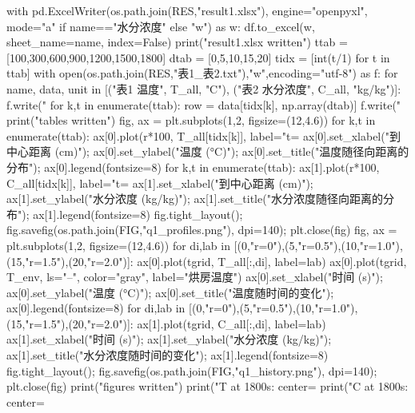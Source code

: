 \begin{codelisting}
    with pd.ExcelWriter(os.path.join(RES,"result1.xlsx"), engine="openpyxl", mode="a" if name=="水分浓度" else "w") as w:
        df.to_excel(w, sheet_name=name, index=False)
print("result1.xlsx written")
ttab = [100,300,600,900,1200,1500,1800]
dtab = [0,5,10,15,20]
tidx = [int(t/1) for t in ttab]
with open(os.path.join(RES,"表1_表2.txt"),"w",encoding="utf-8") as f:
    for name, data, unit in [("表1 温度", T_all, "C"), ("表2 水分浓度", C_all, "kg/kg")]:
        f.write("\n%
        for k,t in enumerate(ttab):
            row = data[tidx[k], np.array(dtab)]
            f.write("%
print("tables written")
fig, ax = plt.subplots(1,2, figsize=(12,4.6))
for k,t in enumerate(ttab):
    ax[0].plot(r*100, T_all[tidx[k]], label="t=%
ax[0].set_xlabel("到中心距离 (cm)"); ax[0].set_ylabel("温度 (°C)"); ax[0].set_title("温度随径向距离的分布"); ax[0].legend(fontsize=8)
for k,t in enumerate(ttab):
    ax[1].plot(r*100, C_all[tidx[k]], label="t=%
ax[1].set_xlabel("到中心距离 (cm)"); ax[1].set_ylabel("水分浓度 (kg/kg)"); ax[1].set_title("水分浓度随径向距离的分布"); ax[1].legend(fontsize=8)
fig.tight_layout(); fig.savefig(os.path.join(FIG,"q1_profiles.png"), dpi=140); plt.close(fig)
fig, ax = plt.subplots(1,2, figsize=(12,4.6))
for di,lab in [(0,"r=0"),(5,"r=0.5"),(10,"r=1.0"),(15,"r=1.5"),(20,"r=2.0")]:
    ax[0].plot(tgrid, T_all[:,di], label=lab)
ax[0].plot(tgrid, T_env, ls="--", color="gray", label="烘房温度")
ax[0].set_xlabel("时间 (s)"); ax[0].set_ylabel("温度 (°C)"); ax[0].set_title("温度随时间的变化"); ax[0].legend(fontsize=8)
for di,lab in [(0,"r=0"),(5,"r=0.5"),(10,"r=1.0"),(15,"r=1.5"),(20,"r=2.0")]:
    ax[1].plot(tgrid, C_all[:,di], label=lab)
ax[1].set_xlabel("时间 (s)"); ax[1].set_ylabel("水分浓度 (kg/kg)"); ax[1].set_title("水分浓度随时间的变化"); ax[1].legend(fontsize=8)
fig.tight_layout(); fig.savefig(os.path.join(FIG,"q1_history.png"), dpi=140); plt.close(fig)
print("figures written")
print("T at 1800s: center=%
print("C at 1800s: center=%
\end{codelisting}

